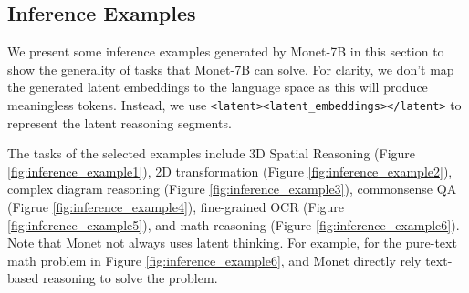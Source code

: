 \subsection{Inference Examples}
We present some inference examples generated by Monet-7B in this section to show the generality of tasks that Monet-7B can solve. For clarity, we don't map the generated latent embeddings to the language space as this will produce meaningless tokens. Instead, we use \verb|<latent><latent_embeddings></latent>| to represent the latent reasoning segments.

The tasks of the selected examples include 3D Spatial Reasoning (Figure \ref{fig:inference_example1}), 2D transformation (Figure \ref{fig:inference_example2}), complex diagram reasoning (Figure \ref{fig:inference_example3}), commonsense QA (Figrue \ref{fig:inference_example4}), fine-grained OCR (Figure \ref{fig:inference_example5}), and math reasoning (Figure \ref{fig:inference_example6}). Note that Monet not always uses latent thinking. For example, for the pure-text math problem in Figure \ref{fig:inference_example6}, and Monet directly rely text-based reasoning to solve the problem.







